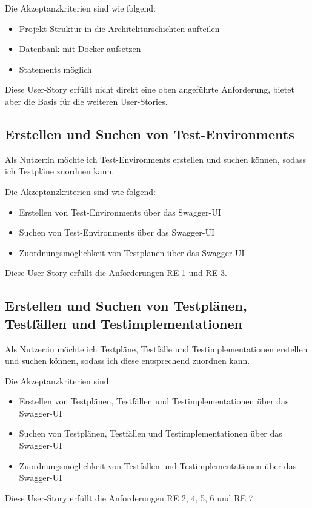 \documentclass[a4paper, fontsize=11pt, parskip=half, twoside]{scrreprt}
\begin{document}
	Die Akzeptanzkriterien sind wie folgend:
	\begin{itemize}
		\item Projekt Struktur in die Architekturschichten aufteilen 
		\item Datenbank mit Docker aufsetzen
		\item {} Statements möglich
	\end{itemize}

	Diese User-Story erfüllt nicht direkt eine oben angeführte Anforderung, bietet aber die Basis für die weiteren User-Stories.
	
	\subsection{Erstellen und Suchen von Test-Environments}
	Als Nutzer:in möchte ich Test-Environments erstellen und suchen können, sodass ich Testpläne zuordnen kann.
	
	Die Akzeptanzkriterien sind wie folgend:
	\begin{itemize}
		\item Erstellen von Test-Environments über das Swagger-UI
		\item Suchen von Test-Environments über das Swagger-UI
		\item Zuordnungsmöglichkeit von Testplänen über das Swagger-UI
	\end{itemize}

	Diese User-Story erfüllt die Anforderungen RE 1 und RE 3.

	\subsection{Erstellen und Suchen von Testplänen, Testfällen und Testimplementationen}
	Als Nutzer:in möchte ich Testpläne, Testfälle und Testimplementationen erstellen und suchen können, sodass ich diese entsprechend zuordnen kann.
	
	Die Akzeptanzkriterien sind:
	\begin{itemize}
		\item Erstellen von Testplänen, Testfällen und Testimplementationen über das Swagger-UI
		\item Suchen von Testplänen, Testfällen und Testimplementationen über das Swagger-UI
		\item Zuordnungsmöglichkeit von Testfällen und Testimplementationen über das Swagger-UI
	\end{itemize}

	Diese User-Story erfüllt die Anforderungen RE 2, 4, 5, 6 und RE 7.
	
\end{document}
